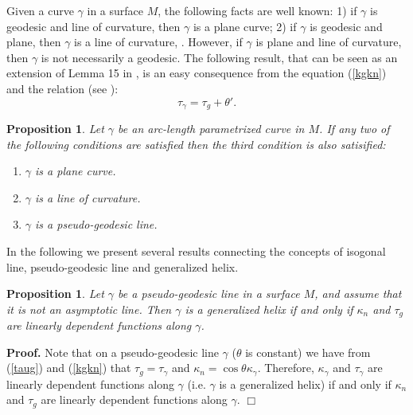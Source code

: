 \documentclass[11pt,a4paper]{article}
\def\g{\gamma}
\newenvironment{proof}{\ignorespaces\par\noindent\textbf{Proof.}\quad}{\hfill$\Box$\par}
\newtheorem{prop}[theo]{Proposition}
\begin{document}
Given a curve $\g$ in a surface $M$, the following facts are well known: 1) if $\g$ is geodesic and line of curvature, then $\g$ is a plane curve; 2) if $\g$ is geodesic and plane, then $\g$ is a line of curvature, \cite[pp. 211--212]{Spivak3}. However, if $\g$ is plane and line of curvature, then $\g$ is not necessarily a geodesic.
The following result, that can be seen as an extension of Lemma 15 in \cite[p. 212]{Spivak3}, is an easy consequence from the equation (\ref{kgkn}) and the relation (see \cite[p. 153]{DoCarmo76}):
\begin{equation}\label{taug}
\tau_\gamma =\tau_g+\theta'.
\end{equation}
\begin{prop}\label{equiv2}
Let $\gamma$ be an arc-length parametrized curve in $M$. If any two of the following conditions are satisfied then the third condition is also satisified:\vspace*{-\topsep}
\begin{enumerate}\itemsep-2pt
\item $\gamma$ is a plane curve.
\item $\gamma$ is a line of curvature.
\item $\gamma$ is a pseudo-geodesic line.
\end{enumerate}
\end{prop}

In the following we present several results connecting the concepts of isogonal line, pseudo-geodesic line and generalized helix.

\begin{prop}\label{p5.0}
Let $\g$ be a pseudo-geodesic line in a surface $M$, and assume that it is not an asymptotic line. Then $\g$ is a generalized helix if and only if $\kappa_n$ and $\tau_g$ are linearly dependent functions along $\g$.
\end{prop}
\begin{proof}
Note that on a pseudo-geodesic line $\g$ ($\theta$ is constant) we have from (\ref{taug}) and (\ref{kgkn}) that $\tau_g=\tau_\g$ and $\kappa_n=\cos\theta\kappa_\g$. Therefore, $\kappa_\g$ and $\tau_\g$ are linearly dependent functions along $\g$ (i.e. $\g$ is a generalized helix) if and only if $\kappa_n$ and $\tau_g$ are linearly dependent functions along $\g$.
\end{proof}
\end{document}
